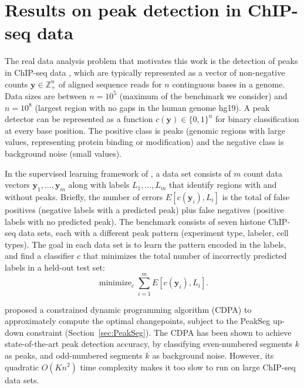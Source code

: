 \documentclass{article}
\DeclareMathOperator*{\minimize}{minimize}
\newcommand{\ZZ}{\mathbb Z}
\begin{document}
\section{Results on peak detection in ChIP-seq data}
\label{sec:results-chip-seq}
\label{sec:results}


The real data analysis problem that motivates this work is the
detection of peaks in ChIP-seq data \citep{practical}, which are
typically represented as a vector of non-negative counts
$\mathbf y\in\ZZ_+^n$ of aligned sequence reads for $n$ continguous
bases in a genome. Data sizes are between $n=10^5$ (maximum of the
benchmark we consider) and $n=10^8$ (largest region with no gaps in
the human genome hg19). A peak detector can be represented
as a function $c(\mathbf y)\in\{0,1\}^n$ for binary classification at
every base position. The positive class is peaks (genomic regions with
large values, representing protein binding or modification) and the
negative class is background noise (small values).


In the supervised learning framework of \citet{HOCKING2016-chipseq}, a
data set consists of $m$ count data vectors
$\mathbf y_1,\dots,\mathbf y_m$ along with labels $L_1,\dots, L_m$
that identify regions with and without peaks. Briefly, the number of
errors $E[c(\mathbf y_i), L_i]$ is the total of false positives
(negative labels with a predicted peak) plus false negatives (positive
labels with no predicted peak). The benchmark consists of seven
histone ChIP-seq data sets, each with a different peak pattern
(experiment type, labeler, cell types). The goal in each data set is
to learn the pattern encoded in the labels, and find a classifier $c$
that minimizes the total number of incorrectly predicted labels in a
held-out test set:
\begin{equation}
  \label{eq:learn}
  \minimize_c
  \sum_{i=1}^m 
  E\left[
    c(\mathbf y_i), L_i
  \right].
\end{equation}

\citet{HOCKING-PeakSeg} proposed a constrained dynamic programming
algorithm (CDPA) to approximately compute the optimal changepoints,
subject to the PeakSeg up-down constraint
(Section~\ref{sec:PeakSeg}). The CDPA has been shown to achieve
state-of-the-art peak detection accuracy, by classifying even-numbered
segments $k$ as peaks, and odd-numbered segments $k$ as background
noise. However, its quadratic $O(Kn^2)$ time complexity makes it too
slow to run on large ChIP-seq data sets.
\end{document}
